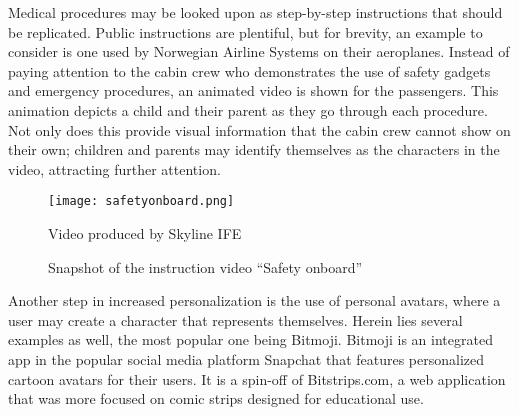 Medical procedures may be looked upon as step-by-step instructions that should be replicated. Public instructions are plentiful, but for brevity, an example to consider is one used by Norwegian Airline Systems on their aeroplanes. Instead of paying attention to the cabin crew who demonstrates the use of safety gadgets and emergency procedures, an animated video \autocite{norwegianairshuttle2012} is shown for the passengers. This animation depicts a child and their parent as they go through each procedure. Not only does this provide visual information that the cabin crew cannot show on their own; children and parents may identify themselves as the characters in the video, attracting further attention.

\begin{figure}
    \centering
    \texttt{[image: safetyonboard.png]}
    \caption{Snapshot of the instruction video \enquote{Safety onboard}}
    Video produced by Skyline IFE
    \label{fig:safetyonboard}
\end{figure}

Another step in increased personalization is the use of personal avatars, where a user may create a character that represents themselves. Herein lies several examples as well, the most popular one being Bitmoji. Bitmoji is an integrated app in the popular social media platform Snapchat that features personalized cartoon avatars for their users. It is a spin-off of Bitstrips.com, a web application that was more focused on comic strips designed for educational use. %
